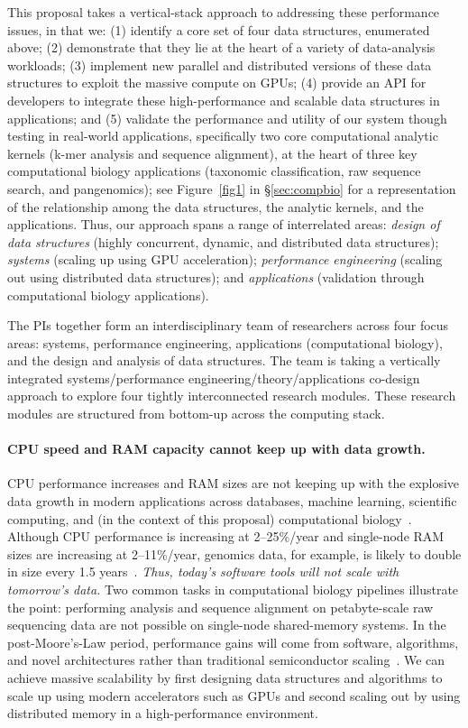 This proposal takes  a vertical-stack approach to addressing these performance issues, in that we: 
(1) identify a core set of four data structures, enumerated above;
(2) demonstrate that they lie at the heart of a variety of data-analysis workloads; (3) implement  
new parallel and distributed versions of these data structures to exploit the
massive compute on GPUs; (4) provide an API for developers to integrate these high-performance
and scalable data structures in applications; and (5) validate the performance and utility of our system though testing in real-world applications, specifically two core computational analytic kernels (k-mer analysis and sequence alignment), at the heart of three key computational biology applications (taxonomic classification, raw sequence search, and pangenomics); see Figure~\ref{fig1} in \S\ref{sec:compbio} for a representation of the relationship among the data structures, the analytic kernels, and the applications.  Thus, our approach spans a range of interrelated areas: 
\emph{design of data structures} (highly concurrent, dynamic, and distributed
data structures); \emph{systems} (scaling up using GPU acceleration);
\emph{performance engineering} (scaling out using distributed data
structures); and \emph{applications} (validation through computational biology applications). 

%
The PIs together form an interdisciplinary team of researchers across four
focus areas: systems, performance engineering, applications (computational biology), and the design and analysis of data structures. The team is taking a vertically integrated
systems/performance engineering/theory/applications co-design approach to explore four tightly
interconnected research modules. These research modules are structured from
bottom-up across the computing stack.


\paragraph{CPU speed and RAM capacity cannot keep up with data growth.} CPU
performance increases and RAM sizes are not keeping up with the explosive data growth in
modern applications across databases, machine learning, scientific computing, and (in the context of this proposal) computational biology~\cite{Chen:2021:TGS}. Although CPU performance is increasing at
2--25\%/year and single-node RAM sizes are increasing at 2--11\%/year, genomics
data, for example, is likely to double in size every 1.5 years~\cite{kodama2012sequence}. 
\emph{Thus, today's software tools will not scale with tomorrow's data.} 
Two common tasks in
computational biology pipelines illustrate the point: 
performing \kmer analysis and sequence alignment  on petabyte-scale raw sequencing data are not
possible on single-node shared-memory systems. 
In the post-Moore's-Law period,
performance gains will come from software, algorithms, and novel architectures rather than
traditional semiconductor scaling~\cite{leiserson2020there}. We can achieve massive scalability by
first designing data structures and algorithms to scale up using modern
accelerators such as GPUs and second scaling out by using distributed memory
in a high-performance environment.



